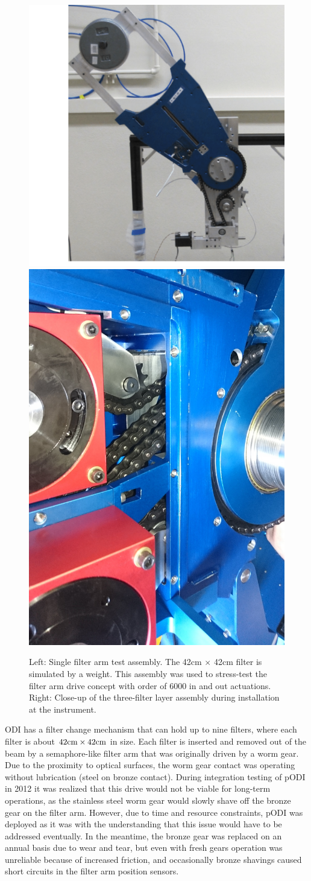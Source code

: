 \documentclass[]{spieman}
\begin{document}
\begin{figure}
	
	\hfill
	\includegraphics[height=0.49\textwidth]{images/filterdrivetest.png}	\hfill
	\includegraphics[height=0.49\textwidth]{images/DSC_0309.JPG} \hfill \hfill
    
	\caption{\label{fig_filterdrive} Left: Single filter arm test assembly. The
    42cm $\times$ 42cm filter is simulated by a weight. This assembly was used to stress-test
    the filter arm drive concept with order of 6000 in and out actuations.
    Right: Close-up of the three-filter layer assembly during installation at the
    instrument.} 

\end{figure}

ODI has a filter change mechanism that can hold up to nine filters, where each
filter is about $42 \rm{cm} \times 42 \rm{cm}$ in size. Each filter is inserted
and removed out of the beam by a semaphore-like filter arm that was originally
driven by a worm gear\cite{Muller2008}. Due to the proximity to optical
surfaces, the worm gear contact was operating without lubrication (steel on
bronze contact). During integration testing of pODI in 2012 it was realized that
this drive would not be viable for long-term operations, as the stainless steel
worm gear would slowly shave off the bronze gear on the filter arm. However, due
to time and resource constraints, pODI was deployed as it was with the understanding that
this issue would have to be addressed eventually. In the meantime, the bronze
gear was replaced on an annual basis due to wear and tear, but even with fresh gears
operation was unreliable because of increased friction, and occasionally bronze shavings caused
short circuits in the filter arm position sensors.
\end{document}
